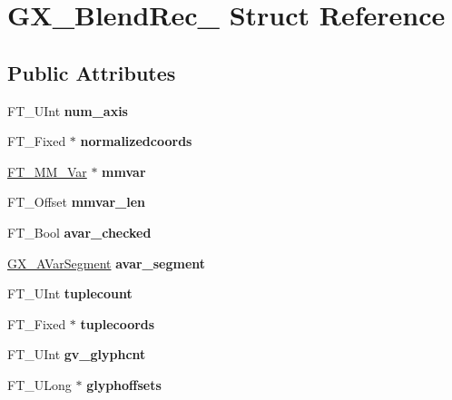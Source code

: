 \hypertarget{struct_g_x___blend_rec__}{}\section{G\+X\+\_\+\+Blend\+Rec\+\_\+ Struct Reference}
\label{struct_g_x___blend_rec__}
\subsection*{Public Attributes}
\begin{DoxyCompactItemize}
\item 
\mbox{\label{struct_g_x___blend_rec___a70b3b03355ad308ddd63e9555e8acd0e}} 
F\+T\+\_\+\+U\+Int {\bfseries num\+\_\+axis}
\item 
\mbox{\label{struct_g_x___blend_rec___a292b7cea3a7e027858f3c27f05d59270}} 
F\+T\+\_\+\+Fixed $\ast$ {\bfseries normalizedcoords}
\item 
\mbox{\label{struct_g_x___blend_rec___a770f7d3eae9c396dfe6bbc8c8286e00f}} 
\hyperlink{struct_f_t___m_m___var__}{F\+T\+\_\+\+M\+M\+\_\+\+Var} $\ast$ {\bfseries mmvar}
\item 
\mbox{\label{struct_g_x___blend_rec___ae901170359808991f7d753551868066d}} 
F\+T\+\_\+\+Offset {\bfseries mmvar\+\_\+len}
\item 
\mbox{\label{struct_g_x___blend_rec___a20440dee5a60c9c85e9bba19dfea1e1f}} 
F\+T\+\_\+\+Bool {\bfseries avar\+\_\+checked}
\item 
\mbox{\label{struct_g_x___blend_rec___a9622ddcd5f674632c5e53628e13875d0}} 
\hyperlink{struct_g_x___a_var_segment_rec__}{G\+X\+\_\+\+A\+Var\+Segment} {\bfseries avar\+\_\+segment}
\item 
\mbox{\label{struct_g_x___blend_rec___a0c2522d15f194dea8865225c6801b950}} 
F\+T\+\_\+\+U\+Int {\bfseries tuplecount}
\item 
\mbox{\label{struct_g_x___blend_rec___a2cb5428f1fa52a53c760624fb2703d1f}} 
F\+T\+\_\+\+Fixed $\ast$ {\bfseries tuplecoords}
\item 
\mbox{\label{struct_g_x___blend_rec___a12334445cd9e4c22742e4f00d65f2306}} 
F\+T\+\_\+\+U\+Int {\bfseries gv\+\_\+glyphcnt}
\item 
\mbox{\label{struct_g_x___blend_rec___ad2fd33dafedc71921834d2f06296d8f7}} 
F\+T\+\_\+\+U\+Long $\ast$ {\bfseries glyphoffsets}
\end{DoxyCompactItemize}


